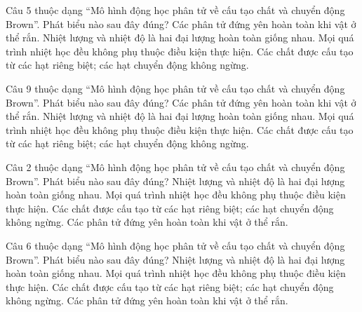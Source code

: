 \begin{ex}
Câu 5 thuộc dạng “Mô hình động học phân tử về cấu tạo chất và chuyển động Brown”. Phát biểu nào sau đây đúng?
\choice
{Các phân tử đứng yên hoàn toàn khi vật ở thể rắn.}
{Nhiệt lượng và nhiệt độ là hai đại lượng hoàn toàn giống nhau.}
{Mọi quá trình nhiệt học đều không phụ thuộc điều kiện thực hiện.}
{\True Các chất được cấu tạo từ các hạt riêng biệt; các hạt chuyển động không ngừng.}
\end{ex}

\begin{ex}
Câu 9 thuộc dạng “Mô hình động học phân tử về cấu tạo chất và chuyển động Brown”. Phát biểu nào sau đây đúng?
\choice
{Các phân tử đứng yên hoàn toàn khi vật ở thể rắn.}
{Nhiệt lượng và nhiệt độ là hai đại lượng hoàn toàn giống nhau.}
{Mọi quá trình nhiệt học đều không phụ thuộc điều kiện thực hiện.}
{\True Các chất được cấu tạo từ các hạt riêng biệt; các hạt chuyển động không ngừng.}
\end{ex}

\begin{ex}
Câu 2 thuộc dạng “Mô hình động học phân tử về cấu tạo chất và chuyển động Brown”. Phát biểu nào sau đây đúng?
\choice
{Nhiệt lượng và nhiệt độ là hai đại lượng hoàn toàn giống nhau.}
{Mọi quá trình nhiệt học đều không phụ thuộc điều kiện thực hiện.}
{\True Các chất được cấu tạo từ các hạt riêng biệt; các hạt chuyển động không ngừng.}
{Các phân tử đứng yên hoàn toàn khi vật ở thể rắn.}
\end{ex}

\begin{ex}
Câu 6 thuộc dạng “Mô hình động học phân tử về cấu tạo chất và chuyển động Brown”. Phát biểu nào sau đây đúng?
\choice
{Nhiệt lượng và nhiệt độ là hai đại lượng hoàn toàn giống nhau.}
{Mọi quá trình nhiệt học đều không phụ thuộc điều kiện thực hiện.}
{\True Các chất được cấu tạo từ các hạt riêng biệt; các hạt chuyển động không ngừng.}
{Các phân tử đứng yên hoàn toàn khi vật ở thể rắn.}
\end{ex}

